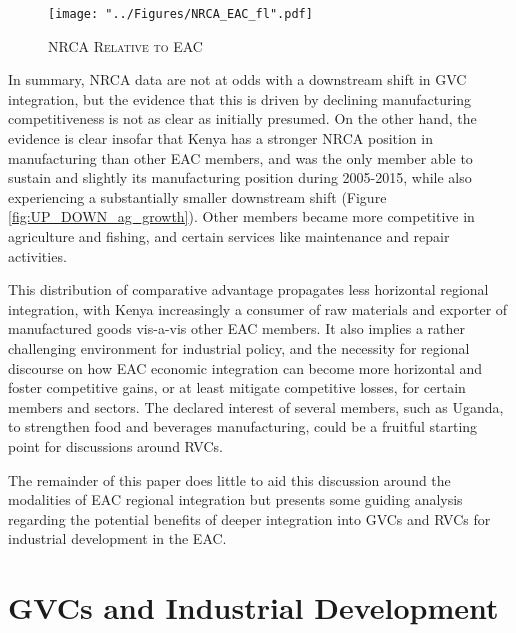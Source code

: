\documentclass[a4paper]{article}
\begin{document}
\begin{figure}[h!]
\centering
\caption{\label{fig:NRCA_EAC}\textsc{NRCA Relative to EAC}}
\texttt{[image: "../Figures/NRCA\_EAC\_fl".pdf]} %
\vspace{-1cm}
\end{figure}
\FloatBarrier

In summary, NRCA data are not at odds with a downstream shift in GVC integration, but the evidence that this is driven by declining manufacturing competitiveness is not as clear as initially presumed. On the other hand, the evidence is clear insofar that Kenya has a stronger NRCA position in manufacturing than other EAC members, and was the only member able to sustain and slightly its manufacturing position during 2005-2015, while also experiencing a substantially smaller downstream shift (Figure \ref{fig:UP_DOWN_ag_growth}). Other members became more competitive in agriculture and fishing, and certain services like maintenance and repair activities. \newline

This distribution of comparative advantage propagates less horizontal regional integration, with Kenya increasingly a consumer of raw materials and exporter of manufactured goods vis-a-vis other EAC members. It also implies a rather challenging environment for industrial policy, and the necessity for regional discourse on how EAC economic integration can become more horizontal and foster competitive gains, or at least mitigate competitive losses, for certain members and sectors.  %
The declared interest of several members, such as Uganda, to strengthen food and beverages manufacturing, could be a fruitful starting point for discussions around RVCs. \newline

 The remainder of this paper does little to aid this discussion around the modalities of EAC regional integration but presents some guiding analysis regarding the potential benefits of deeper integration into GVCs and RVCs for industrial development in the EAC. \newline



\section{GVCs and Industrial Development}
\end{document}
